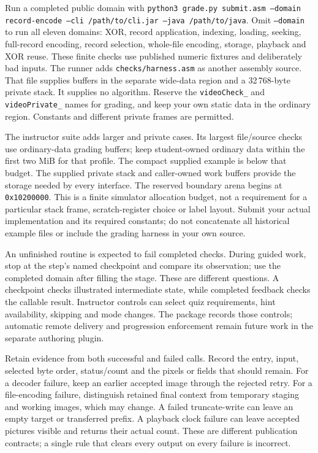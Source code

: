 Run a completed public domain with \texttt{python3 grade.py submit.asm --domain
  record-encode --cli /path/to/cli.jar --java /path/to/java}. Omit \texttt{--domain}
to run all eleven domains: XOR, record application, indexing, loading, seeking,
full-record encoding, record selection, whole-file encoding, storage, playback and
XOR reuse. These finite checks use published numeric fixtures and deliberately bad
inputs. The runner adds \texttt{checks/harness.asm} as another assembly source.
That file supplies buffers in the separate wide-data region and a 32\,768-byte
private stack. It supplies no algorithm. Reserve the \texttt{videoCheck\_} and
\texttt{videoPrivate\_} names for grading, and keep your own static data in the
ordinary region. Constants and different private frames are permitted.

The instructor suite adds larger and private cases. Its largest file/source checks
use ordinary-data grading buffers; keep student-owned ordinary data within the first two MiB for
that profile. The compact supplied example is below that budget. The supplied
private stack and caller-owned work buffers provide the storage needed by every
interface. The reserved boundary arena begins at \texttt{0x10200000}. This is a finite simulator allocation budget, not a requirement for a
particular stack frame, scratch-register choice or label layout. Submit your actual
implementation and its required constants; do not concatenate all historical
example files or include the grading harness in your own source.

An unfinished routine is expected to fail completed checks. During guided work,
stop at the step's named checkpoint and compare its observation; use the completed
domain after filling the stage. These are different questions. A checkpoint checks
illustrated intermediate state, while completed feedback checks the callable result.
Instructor controls can select quiz requirements, hint availability, skipping and
mode changes. The package records those controls; automatic remote delivery and
progression enforcement remain future work in the separate authoring plugin.

Retain evidence from both successful and failed calls. Record the entry, input,
selected byte order, status/count and the pixels or fields that should remain.
For a decoder failure, keep an earlier accepted image through the rejected retry.
For a file-encoding failure, distinguish retained final context from temporary
staging and working images, which may change. A failed truncate-write can leave an
empty target or transferred prefix. A playback clock failure can leave accepted
pictures visible and returns their actual count. These are different publication
contracts; a single rule that clears every output on every failure is incorrect.

